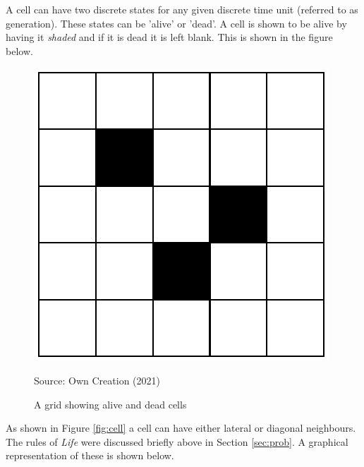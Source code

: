 A cell can have two discrete states for any given discrete time unit (referred to as generation). These states can be 'alive' or 'dead'. A cell is shown to be alive by having it \textsl{shaded} and if it is dead it is left blank.\citep{adamatzky2010game} This is shown in the figure below.
\begin{figure}[H]
\centering
\includegraphics[scale=0.5]{Figures/Chapter2/shaded.png}
\caption{A grid showing alive and dead cells}
\begin{center}
Source: Own Creation (2021)
\end{center}
\end{figure}
As shown in Figure \ref{fig:cell} a cell can have either lateral or diagonal neighbours. The rules of \textsl{Life} were discussed briefly above in Section \ref{sec:prob}. A graphical representation of these is shown below.
